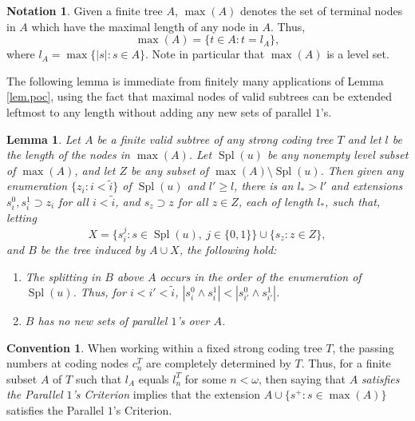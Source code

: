 \documentclass{amsart}
\newtheorem{lem}[thm]{Lemma}
\theoremstyle{remark}
\theoremstyle{definition}
\newtheorem{conv}[thm]{Convention}
\newtheorem{notation}[thm]{Notation}
\theoremstyle{remark}
\newcommand{\om}{\omega}
\DeclareMathOperator{\Spl}{Spl}
\newcommand{\POC}{Parallel $1$'s Criterion}
\begin{document}
\begin{notation}\label{notn.max}
Given a finite tree $A$,  $\max(A)$ denotes
 the set of terminal nodes in $A$ which have the maximal length of any node in $A$.
Thus,
\begin{equation}
\max(A)=\{t\in A:t=l_A\},
\end{equation}
where $l_A=\max\{|s|:s\in A\}$.
Note in particular that $\max(A)$ is a level set.
\end{notation}



The following lemma is immediate from finitely many applications of  Lemma \ref{lem.poc}, using the fact that maximal nodes of valid subtrees can be extended leftmost to any length without adding any new sets of parallel $1$'s.


\begin{lem}\label{lem.factssplit}
Let $A$ be a finite  valid subtree of any strong coding tree  $T$ and let $l$ be the  length of the nodes in $\max(A)$.
Let $\Spl(u)$ be any nonempty level  subset of $ \max(A)$, and
 let $Z$ be any subset of
 $\max(A)\setminus\Spl(u)$.
Then given any enumeration
$\{z_i:i<\tilde{i}\}$ of $\Spl(u)$ and
$l'\ge l$,
 there is an $l_*>l'$
 and extensions
$s_i^0,s_i^1\supset z_i$ for all $i<\tilde{i}$,
and $s_z\supset z$ for all $z\in Z$, each of length $l_*$,
such that, letting
\begin{equation}
X=\{s_i^j:s\in\Spl(u),\ j\in\{0,1\}\}\cup\{s_z:z\in Z\},
\end{equation}
and $B$ be the tree induced by $A\cup X$,
 the following hold:
\begin{enumerate}
\item
The splitting in $B$ above $A$ occurs in the order of the enumeration of $\Spl(u)$.
Thus, for $i<i'<\tilde{i}$,
$|s_i^0\wedge s_i^1|<|s_{i'}^0\wedge s_{i'}^1|$.
\item
$B$ has no new sets of parallel $1$'s over $A$.
\end{enumerate}
\end{lem}





\begin{conv}\label{conv.POC}
When working within a fixed strong coding tree $T$,
the passing numbers at coding nodes $c^T_n$ are completely determined by $T$.
Thus,   for a finite subset $A$ of  $T$ such that
 $l_A$ equals $l_n^T$ for some $n<\om$,
then
 saying  that  $A$  {\em  satisfies the \POC} implies that  the extension
$A\cup\{s^+:s\in\max(A)\}$ satisfies the \POC.
\end{conv}
\end{document}
